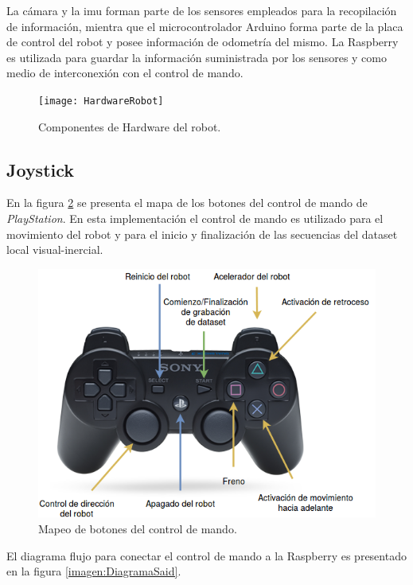La cámara y la imu forman parte de los sensores empleados para la recopilación de información, mientra que el microcontrolador Arduino forma parte de la placa de control del robot y posee información de odometría del mismo. La Raspberry es utilizada para guardar la información suministrada por los sensores y como medio de interconexión con el control de mando.

\begin{figure}[H]
	\centering
	\texttt{[image: HardwareRobot]}
	\caption[Componentes de Hardware del robot]{Componentes de Hardware del robot.}
	\label{imagen:HardwareRobot}
\end{figure}

\subsection{Joystick}

En la figura \ref{imagen:Joystick} se presenta el mapa de los botones del control de mando de \textit{PlayStation}. En esta implementación el control de mando es utilizado para el movimiento del robot y para el inicio y finalización de las secuencias del dataset local visual-inercial.

\begin{figure}[H]
	\centering	
	\includegraphics[width=0.7\linewidth]{imagenes/prototipo/Joystick}
	\caption{Mapeo de botones del control de mando.}
	\label{imagen:Joystick}
\end{figure}

El diagrama flujo para conectar el control de mando a la Raspberry es presentado en la figura \ref{imagen:DiagramaSaid}.


